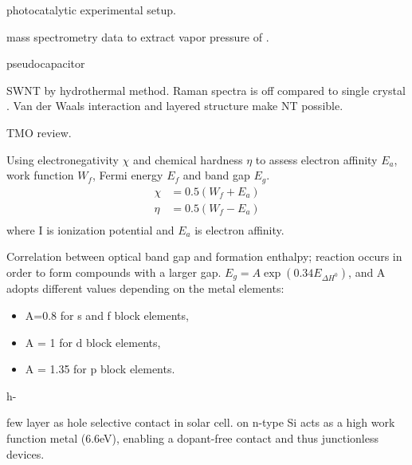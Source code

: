 photocatalytic experimental setup.\cite{Hupka2006}

mass spectrometry data to extract vapor pressure of .

 pseudocapacitor  \cite{Brezesinski2010}

 SWNT by hydrothermal method.\cite{Hu2008a} Raman spectra is off compared to single crystal .  Van der Waals interaction and layered structure make NT possible.

TMO review.\cite{Goodenough2013}

\cite{Matar2011} Using electronegativity $\chi$ and chemical hardness $\eta$ to assess electron affinity $E_a$, work function $W_f$, Fermi energy $E_f$ and band gap $E_g$.
\begin{align}
\chi &= 0.5(W_f + E_a)\\
\eta & = 0.5(W_f - E_a)\\
\end{align}
where I is ionization potential and $E_a$ is electron affinity.

Correlation between optical band gap and formation enthalpy; reaction occurs in order to form compounds with a larger gap.  $E_g = A \exp(0.34E_{\Delta H^0})$, and A adopts different values depending on the metal elements:
\begin{itemize}
\item A=0.8 for s and f block elements,
\item A = 1 for d block elements,
\item A = 1.35 for p block elements.
\end{itemize}

h- \cite{Lunk2010} \cite{Zheng2009}

 few layer as hole selective contact in solar cell.\cite{Battaglia2014}
 on n-type Si acts as a high work function metal (6.6eV), enabling a dopant-free contact and thus junctionless devices.

